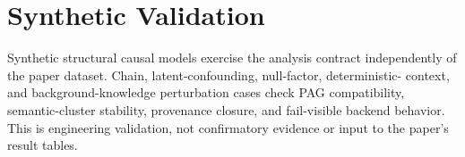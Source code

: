 \section{Synthetic Validation}

Synthetic structural causal models exercise the analysis contract independently
of the paper dataset. Chain, latent-confounding, null-factor, deterministic-
context, and background-knowledge perturbation cases check PAG compatibility,
semantic-cluster stability, provenance closure, and fail-visible backend
behavior. This is engineering validation, not confirmatory evidence or input
to the paper's result tables.
